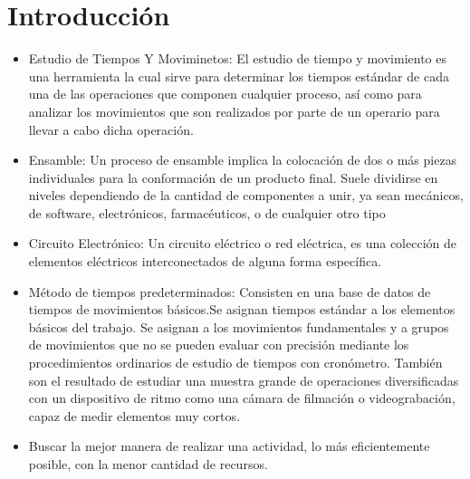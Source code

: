     \section{Introducción}
    \begin{itemize}
        \item Estudio de Tiempos Y Moviminetos: El estudio de tiempo y movimiento es una herramienta la cual sirve para determinar los tiempos estándar de cada una de las operaciones que componen cualquier proceso, así como para analizar los movimientos que son realizados por parte de un operario para llevar a cabo dicha operación.
        \item  Ensamble: Un proceso de ensamble implica la colocación de dos o más piezas individuales para la conformación de un producto final. Suele dividirse en niveles dependiendo de la cantidad de componentes a unir, ya sean mecánicos, de software, electrónicos, farmacéuticos, o de cualquier otro tipo
        \item Circuito Electrónico: Un circuito eléctrico o red eléctrica, es una colección de elementos eléctricos interconectados de alguna forma específica. 
        \item Método de tiempos predeterminados: Consisten en una base de datos de tiempos de movimientos básicos.Se asignan tiempos estándar a los elementos básicos del trabajo. Se asignan a los movimientos fundamentales y a grupos de movimientos que no se pueden evaluar con precisión mediante los procedimientos ordinarios de estudio de tiempos con cronómetro. También son el resultado de estudiar una muestra grande de operaciones diversificadas con un dispositivo de ritmo como una cámara de filmación o videograbación, capaz de medir elementos muy cortos.
        \item Buscar la mejor manera de realizar una actividad, lo más eficientemente posible, con la menor cantidad de recursos.
    \end{itemize}
     
